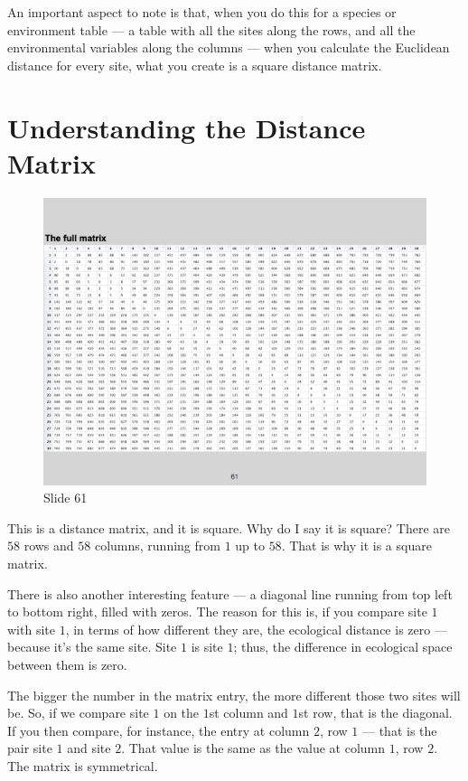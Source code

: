 \documentclass[
  10pt,
]{book}
\begin{document}
An important aspect to note is that, when you do this for a species or
environment table --- a table with all the sites along the rows, and all
the environmental variables along the columns --- when you calculate the
Euclidean distance for every site, what you create is a square distance
matrix.

\section{Understanding the Distance
Matrix}\label{understanding-the-distance-matrix}

\begin{figure}[ht]
\centering
\includegraphics[width=0.8\linewidth]{../images/BDC334/BDC334-061.jpeg}
\caption*{Slide 61}
\end{figure}

This is a distance matrix, and it is square. Why do I say it is square?
There are \(58\) rows and \(58\) columns, running from \(1\) up to
\(58\). That is why it is a square matrix.

There is also another interesting feature --- a diagonal line running
from top left to bottom right, filled with zeros. The reason for this
is, if you compare site \(1\) with site \(1\), in terms of how different
they are, the ecological distance is zero --- because it's the same
site. Site \(1\) is site \(1\); thus, the difference in ecological space
between them is zero.

The bigger the number in the matrix entry, the more different those two
sites will be. So, if we compare site \(1\) on the \(1\)st column and
\(1\)st row, that is the diagonal. If you then compare, for instance,
the entry at column \(2\), row \(1\) --- that is the pair site \(1\) and
site \(2\). That value is the same as the value at column \(1\), row
\(2\). The matrix is symmetrical.
\end{document}
